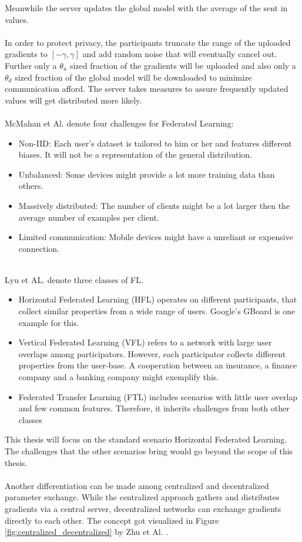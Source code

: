 \documentclass[
	ngerman,
	ruledheaders=section,%
	class=report,%
	thesis={type=bachelor},%
	accentcolor=1b,%
	custommargins=true,%
	marginpar=false,%
	parskip=half-,%
	fontsize=11pt,%
]{tudapub}
\begin{document}
Meanwhile the server updates the global model with the average of the sent in values.\\
\\
In order to protect privacy, the participants truncate the range of the uploaded gradients to $[-\gamma, \gamma]$ and add random noise that will eventually cancel out. Further only a $\theta _u$ sized fraction of the gradients will be uploaded and also only a $\theta _d$ sized fraction of the global model will be downloaded to minimize communication afford. The server takes measures to assure frequently updated values will get distributed more likely.\\
\\
McMahan et Al. denote four challenges for Federated Learning:\\
\begin{itemize}
    \item Non-IID: Each user's dataset is tailored to him or her and features different biases. It will not be a representation of the general distribution.
    \item Unbalanced: Some devices might provide a lot more training data than others.
    \item Massively distributed: The number of clients might be a lot larger then the average number of examples per client.
    \item Limited communication: Mobile devices might have a unreliant or expensive connection.
\end{itemize}{}
\\
Lyu et AL. \cite{lyu2020threats} denote three classes of FL.
\begin{itemize}
    \item Horizontal Federated Learning (HFL) operates on different participants, that collect similar properties from a wide range of users. Google's GBoard is one example for this.
    \item Vertical Federated Learning (VFL) refers to a network with large user overlaps among participators. However, each participator collects different properties from the user-base. A cooperation between an insurance, a finance company and a banking company might exemplify this.
    \item Federated Transfer Learning (FTL) includes scenarios with little user overlap and few common features. Therefore, it inherits challenges from both other classes
\end{itemize}
This thesis will focus on the standard scenario Horizontal Federated Learning. The challenges that the other scenarios bring would go beyond the scope of this thesis.\\
\\
Another differentiation can be made among centralized and decentralized parameter exchange. While the centralized approach gathers and distributes gradients via a central server, decentralized networks can exchange gradients directly to each other. The concept got visualized in Figure \ref{fig:centralized_decentralized} by Zhu et Al. \cite{zhu2019deep}.
\end{document}
